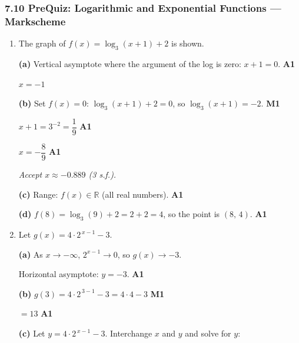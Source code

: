 \documentclass[12pt, twoside]{article}
\begin{document}
\subsubsection*{7.10 PreQuiz: Logarithmic and Exponential Functions ---
Markscheme}

\begin{enumerate}[itemsep=0.3cm]

\item[1.] [Maximum mark: 6]

The graph of $f(x) = \log_{3}(x+1) + 2$ is shown.

\medskip

\textbf{(a)} Vertical asymptote where the argument of the log is zero:
$x + 1 = 0$. \hfill \textbf{A1}

$x = -1$

\medskip

\textbf{(b)} Set $f(x) = 0$:
$\log_{3}(x + 1) + 2 = 0$, so $\log_{3}(x + 1) = -2$. \hfill \textbf{M1}

$x + 1 = 3^{-2} = \dfrac{1}{9}$ \hfill \textbf{A1}

$x = -\dfrac{8}{9}$ \hfill \textbf{A1}

\emph{Accept $x \approx -0.889$ (3 s.f.).}

\medskip

\textbf{(c)} Range: $f(x) \in \mathbb{R}$ (all real numbers).
\hfill \textbf{A1}

\medskip

\textbf{(d)} $f(8) = \log_{3}(9) + 2 = 2 + 2 = 4$, so the point is
$(8,\, 4)$. \hfill \textbf{A1}

\newpage

\item[2.] [Maximum mark: 6]

Let $g(x) = 4 \cdot 2^{\,x-1} - 3$.

\medskip

\textbf{(a)} As $x \to -\infty$, $2^{x-1} \to 0$, so $g(x) \to -3$.

Horizontal asymptote: $y = -3$. \hfill \textbf{A1}

\medskip

\textbf{(b)} $g(3) = 4 \cdot 2^{\,3-1} - 3 = 4 \cdot 4 - 3$
\hfill \textbf{M1}

$= 13$ \hfill \textbf{A1}

\medskip

\textbf{(c)} Let $y = 4 \cdot 2^{\,x-1} - 3$. Interchange $x$ and $y$
and solve for $y$:


\end{enumerate}
\end{document}
